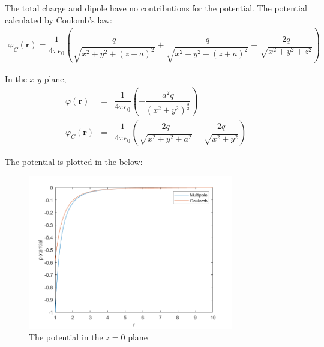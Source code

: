 \documentclass[a4paper,9pt]{article}
\begin{document}
\begin{enumerate}
\begin{enumerate}
    The total charge and dipole have no contributions for the potential.
    The potential calculated by Coulomb's law:
    \begin{eqnarray}
      \varphi_C(\boldsymbol{r})=\dfrac{1}{4\pi\epsilon_0}(\dfrac{q}{\sqrt{x^2+y^2+(z-a)^2}}+\dfrac{q}{\sqrt{x^2+y^2+(z+a)^2}}-\dfrac{2q}{\sqrt{x^2+y^2+z^2}})
    \end{eqnarray}

    In the $x$-$y$ plane, 
    \begin{eqnarray}
      \varphi(\boldsymbol{r})&=&\dfrac{1}{4\pi\epsilon_0}(-\dfrac{a^2q}{{(x^2+y^2)}^{\frac{3}{2}}})\\
      \varphi_C(\boldsymbol{r})&=&\dfrac{1}{4\pi\epsilon_0}(\dfrac{2q}{\sqrt{x^2+y^2+a^2}}-\dfrac{2q}{\sqrt{x^2+y^2}})
    \end{eqnarray}

    The potential is plotted in the below:
    \begin{figure}[h]
      \centering
      \includegraphics[width=0.8\textwidth]{4.png}\caption{The potential in the $z=0$ plane}
    \end{figure}
  \end{enumerate}


\end{enumerate}
\end{document}
